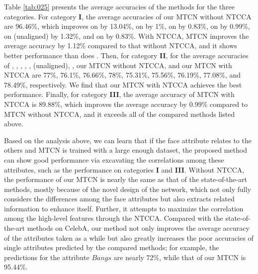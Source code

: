 \documentclass{sig-alternate-05-2015}
\begin{document}
  Table \ref{tab:025} presents the average accuracies of the methods for the three categories. For category \textbf{I}, the average accuracies of our MTCN without NTCCA are 96.46\%, which improves on \cite{7410782} by 13.04\%, on \cite{rudd2016moon} by 1\%, on \cite{hand2017attributes} by 0.83\%, on \cite{gunther2016affact} by 0.99\%, on \cite{gunther2016affact} (unaligned) by 1.32\%, and on \cite{ding2017deep} by 0.83\%. With NTCCA, MTCN improves the average accuracy by 1.12\% compared to that without NTCCA, and it shows better performance than does \cite{Han2017Heterogeneous}. Then, for category \textbf{II}, for the average accuracies of \cite{7410782}, \cite{rudd2016moon}, \cite{hand2017attributes},  \cite{Han2017Heterogeneous}, \cite{gunther2016affact}, \cite{gunther2016affact} (unaligned), \cite{ding2017deep}, our MTCN without NTCCA, and our MTCN with NTCCA  are 77\%, 76.1\%, 76.66\%, 78\%, 75.31\%, 75.56\%, 76.19\%, 77.08\%, and 78.49\%, respectively. We find that our MTCN with NTCCA achieves the best performance. Finally, for category \textbf{III}, the average accuracy of MTCN with NTCCA is 89.88\%, which improves the average accuracy by 0.99\% compared to MTCN without NTCCA, and it exceeds all of the compared methods listed above.

 Based on the analysis above, we can learn that if the face attribute relates to the others and MTCN is trained with a large enough dataset, the proposed method can show good performance via excavating the correlations among these attributes, such as the performance on categories \textbf{I} and \textbf{III}. Without NTCCA, the performance of our MTCN is nearly the same as that of the state-of-the-art methods, mostly because of the novel design of the network, which not only fully considers the differences among the face attributes but also extracts related information  to enhance itself. Further, it attempts to maximize the correlation among the high-level features through the NTCCA. Compared with the state-of-the-art methods on CelebA, our method not only improves the average accuracy of the attributes taken as a while but also greatly increases the poor accuracies of single attributes predicted by the compared methods; for example, the predictions for the attribute $Bangs$ are nearly 72\%, while that of our MTCN is 95.44\%.
\end{document}
